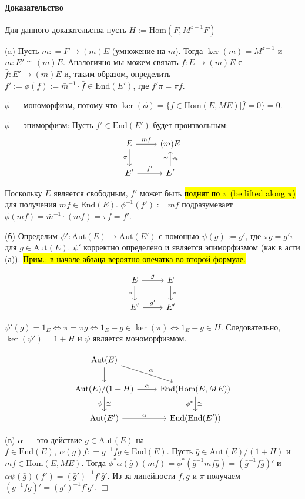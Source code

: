 \documentclass[a4paper,12pt]{article}
\newcommand{\Endom}{\text{End}}
\newcommand{\Hom}{\text{Hom}}
\newcommand{\Aut}{\text{Aut}}
\begin{document}
 
\paragraph{Доказательство}
Для данного доказательства пусть $H:= \Hom(F, M^{z-1} F)$

(a) Пусть $m : = F \rightarrow (m)E$ (умножение на $m$). Тогда $\ker (m) = M^{z-1}$ и $\bar{m} : E' \cong (m)E$. Аналогично мы можем связать $f : E\rightarrow(m)E$ с $\bar{f} : E' \rightarrow (m)E$ и, таким образом, определить $f' := \phi(f) := \bar{m}^{-1} \cdot \bar{f} \in \Endom(E')$, где $f'\pi = \pi f$.

$\phi$ --- мономорфизм, потому что $\ker(\phi) = \{f \in \Hom(E, ME) | \bar{f} = 0\} = 0$.

$\phi$ --- эпиморфизм: Пусть $f' \in \Endom(E')$ будет произвольным:
$$
\begin{tikzcd}
	E	\ar{d}[']{\pi} \arrow{r}{mf}	& (m)E \\
	E' 	\rar{f'}							& E' \ar{u}{\cong}[']{\bar{m}}
\end{tikzcd}
$$

Поскольку $E$ является свободным, $f'$ может быть \hl{поднят по $\pi$ (be lifted along $\pi$)} для получения $mf \in \Endom(E)$. $\phi^{-1}(f') := mf$ подразумевает $\phi(mf) = \bar{m}^{-1} \cdot (mf) = \pi \bar{f} = f'$.

(б) Определим $\psi' : \Aut(E) \rightarrow \Aut(E')$ с помощью $\psi (g) := g'$, где $\pi g = g' \pi$ для $g \in \Aut(E)$. $\psi'$ корректно определено и является эпиморфизмом (как в асти (а)). \hl{Прим.: в начале абзаца вероятно опечатка во второй формуле.} 

$$
\begin{tikzcd}
	E	\ar{d}[']{\pi} \arrow{r}{g}	& E \ar{d}{\pi} \\
	E' 	\rar{g'}			& E'
\end{tikzcd}
$$

$\psi' (g) = 1_E  \Leftrightarrow \pi = \pi g \Leftrightarrow 1_E - g \in \ker(\pi) \Leftrightarrow 1_E - g \in H$. Следовательно, $\ker(\psi') = 1 + H$ и $\psi$ является мономорфизмом.


$$
\begin{tikzcd}
	\Aut(E) \ar{d} \ar{rd}{\alpha} & \\
	\Aut(E) / (1+H) \rar{\alpha} \dar{\cong}[']{\psi}& \Endom(\Hom(E,ME)) \dar{\cong}[']{\phi^*} \\
	\Aut(E') \rar{\alpha}&  \Endom(\Endom(E'))
\end{tikzcd}
$$

(в) $\alpha$ --- это действие $g \in \Aut(E)$ на $f \in \Endom(E), ~ \alpha (g) f : = g^{-1} f g \in \Endom(E)$. Пусть $\bar{g} \in \Aut(E)/(1+H)$ и $mf \in \Hom(E, ME)$. Тогда $\phi^* \alpha (\bar{g})(mf) = \phi^*(\bar{g}^{-1}mf\bar{g}) = (\bar{g}^{-1} f \bar{g})'$ и $\alpha \psi (\bar{g})(f') = (\bar{g}')^{-1} f' \bar{g}'$. Из-за линейности $f, g$ и $\pi$ получаем $(\bar{g}^{-1} f \bar{g})' = (\bar{g}')^{-1}f'\bar{g}'$. $\Box$
\end{document}

